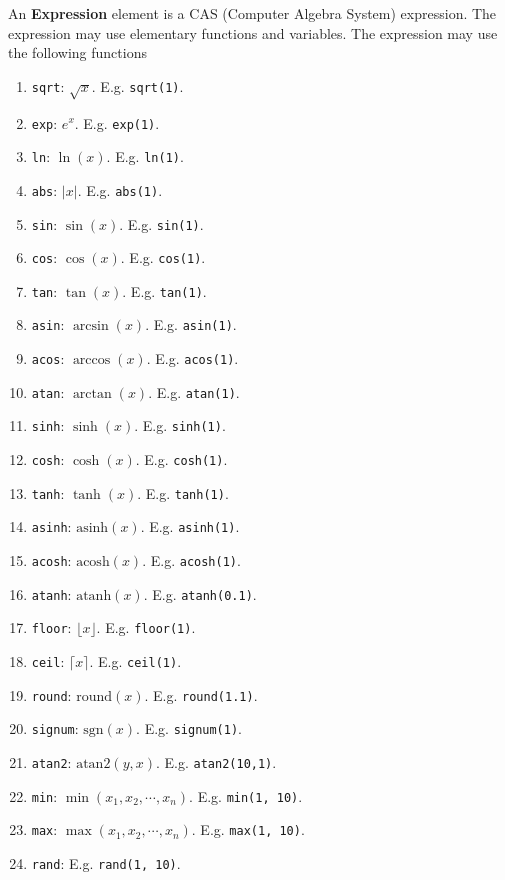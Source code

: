 \documentclass[a4paper]{article}
\begin{document}
An \textbf{Expression} element is a \gls{CAS} (Computer Algebra System) expression.
The expression may use elementary functions and variables.
The expression may use the following functions
\begin{enumerate}
    \item \texttt{sqrt}: \(\sqrt{x}\). E.g. \texttt{sqrt(1)}.
    \item \texttt{exp}: \(e^x\). E.g. \texttt{exp(1)}.
    \item \texttt{ln}: \(\ln(x)\). E.g. \texttt{ln(1)}.
    \item \texttt{abs}: \(|x|\). E.g. \texttt{abs(1)}.
    
    \item \texttt{sin}: \(\sin(x)\). E.g. \texttt{sin(1)}.
    \item \texttt{cos}: \(\cos(x)\). E.g. \texttt{cos(1)}.
    \item \texttt{tan}: \(\tan(x)\). E.g. \texttt{tan(1)}.
    \item \texttt{asin}: \(\arcsin(x)\). E.g. \texttt{asin(1)}.
    \item \texttt{acos}: \(\arccos(x)\). E.g. \texttt{acos(1)}.
    \item \texttt{atan}: \(\arctan(x)\). E.g. \texttt{atan(1)}.
    \item \texttt{sinh}: \(\sinh(x)\). E.g. \texttt{sinh(1)}.
    \item \texttt{cosh}: \(\cosh(x)\). E.g. \texttt{cosh(1)}.
    \item \texttt{tanh}: \(\tanh(x)\). E.g. \texttt{tanh(1)}.
    \item \texttt{asinh}: \(\text{asinh}(x)\). E.g. \texttt{asinh(1)}.
    \item \texttt{acosh}: \(\text{acosh}(x)\). E.g. \texttt{acosh(1)}.
    \item \texttt{atanh}: \(\text{atanh}(x)\). E.g. \texttt{atanh(0.1)}.
    \item \texttt{floor}: \(\lfloor x \rfloor\). E.g. \texttt{floor(1)}.
    \item \texttt{ceil}: \(\lceil x \rceil\). E.g. \texttt{ceil(1)}.
    \item \texttt{round}: \(\text{round}(x)\). E.g. \texttt{round(1.1)}.
    \item \texttt{signum}: \(\text{sgn}(x)\). E.g. \texttt{signum(1)}.
    \item \texttt{atan2}: \(\text{atan2}(y,x)\). E.g. \texttt{atan2(10,1)}.
    \item \texttt{min}: \(\min(x_1, x_2, \cdots, x_n)\). E.g. \texttt{min(1, 10)}.
    \item \texttt{max}: \(\max(x_1, x_2, \cdots, x_n)\). E.g. \texttt{max(1, 10)}.
    \item \texttt{rand}: E.g. \texttt{rand(1, 10)}.
\end{enumerate}
\end{document}
